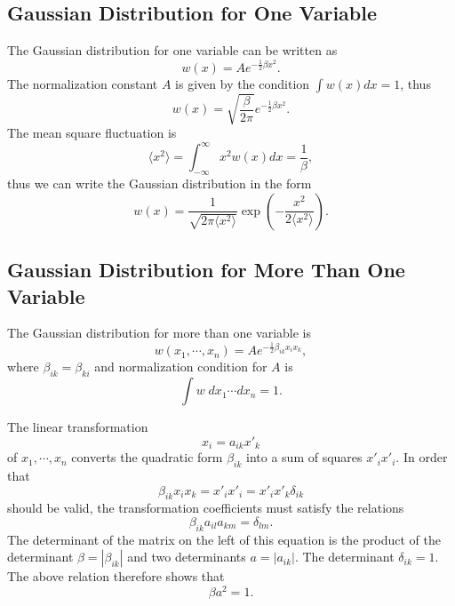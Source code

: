 \documentclass{book}
\newcommand{\average}[1]{\langle#1\rangle}
\numberwithin{equation}{section}
\begin{document}
\subsection{Gaussian Distribution for One Variable}
The Gaussian distribution for one variable can be written as
\begin{equation}
  w(x)=Ae^{-\frac{1}{2}\beta x^2}.
\end{equation}
The normalization constant $A$ is given by the condition $\int
w(x)dx=1$, thus
\begin{equation}
  w(x)=\sqrt{\frac{\beta}{2\pi}}e^{-\frac{1}{2}\beta x^2}.
\end{equation}
The mean square fluctuation is
\begin{equation}
  \average{x^2}=\int_{-\infty}^\infty x^2w(x)dx=\frac{1}{\beta},
\end{equation}
thus we can write the Gaussian distribution in the form
\begin{equation}
  w(x)=\frac{1}{\sqrt{2\pi\average{x^2}}}\exp
  \left(-\frac{x^2}{2\average{x^2}}\right).
\end{equation}

\subsection{Gaussian Distribution for More Than One Variable}
The Gaussian distribution for more than one variable is
\begin{equation}
  w(x_1,\cdots,x_n)=Ae^{-\frac{1}{2}\beta_{ik}x_ix_k},
\end{equation}
where $\beta_{ik}=\beta_{ki}$ and normalization condition for $A$ is
\begin{equation}
  \int w\;dx_1\cdots dx_n=1.
\end{equation}

The linear transformation 
\begin{equation}
  x_i=a_{ik}x'_k
\end{equation}
of $x_1,\cdots,x_n$ converts the quadratic form $\beta_{ik}$ into a sum
of squares $x'_ix'_i$. In order that
\begin{equation}
  \beta_{ik}x_ix_k=x'_ix'_i=x'_ix'_k\delta_{ik}
\end{equation}
should be valid, the transformation coefficients must satisfy the
relations
\begin{equation}
  \beta_{ik}a_{il}a_{km}=\delta_{lm}.
\end{equation}
The determinant of the matrix on the left of this equation is the
product of the determinant $\beta=|\beta_{ik}|$ and two determinants
$a=|a_{ik}|$. The determinant $\delta_{ik}=1$. The above relation
therefore shows that
\begin{equation}
  \beta a^2=1.
\end{equation}
\end{document}
